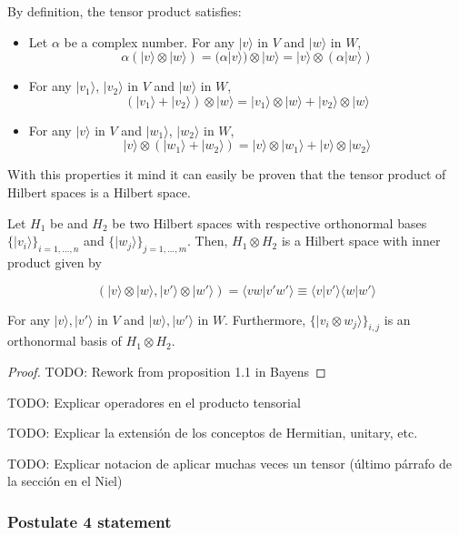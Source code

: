 By definition, the tensor product satisfies:

\begin{itemize}
	\item Let $\alpha$ be a complex number. For any $|v\rangle$ in $V$ and $|w\rangle$ in $W$,
	$$ \alpha(|v\rangle \otimes |w\rangle) = (\alpha|v\rangle) \otimes |w\rangle = |v\rangle \otimes (\alpha|w\rangle) $$
	
	\item For any $|v_1\rangle$, $|v_2\rangle$ in $V$ and $|w\rangle$ in $W$,
	$$ (|v_1\rangle + |v_2\rangle) \otimes |w\rangle = |v_1\rangle \otimes |w\rangle + |v_2\rangle \otimes |w\rangle $$
	
	\item For any $|v\rangle$ in $V$ and $|w_1\rangle$, $|w_2\rangle$ in $W$,
	$$ |v\rangle \otimes (|w_1\rangle + |w_2\rangle) = |v\rangle \otimes |w_1\rangle + |v\rangle \otimes |w_2\rangle $$
\end{itemize}

With this properties it mind it can easily be proven that the tensor product of Hilbert spaces is a Hilbert space.

\begin{proposition}
	Let $H_1$ be and $H_2$ be two Hilbert spaces with respective orthonormal bases $\{|v_i\rangle\}_{i=1,\dots,n}$ and $\{|w_j\rangle\}_{j=1,\dots,m}$. Then, $H_1 \otimes H_2$ is a Hilbert space with inner product given by
	
	$$ ( |v\rangle \otimes |w\rangle, |v'\rangle \otimes |w'\rangle) = \langle vw|v'w'\rangle \equiv \langle v|v'\rangle\langle w|w'\rangle $$
	
	For any $|v\rangle, |v'\rangle$ in $V$ and $|w\rangle, |w'\rangle$ in $W$. Furthermore, $\{|v_i \otimes w_j\rangle\}_{i,j}$ is an orthonormal basis of $H_1 \otimes H_2$.
\end{proposition}

\begin{proof}
	TODO: Rework from proposition 1.1 in Bayens 
\end{proof}


TODO: Explicar operadores en el producto tensorial

TODO: Explicar la extensión de los conceptos de Hermitian, unitary, etc.

TODO: Explicar notacion de aplicar muchas veces un tensor (último párrafo de la sección en el Niel)


\subsubsection{Postulate 4 statement}


